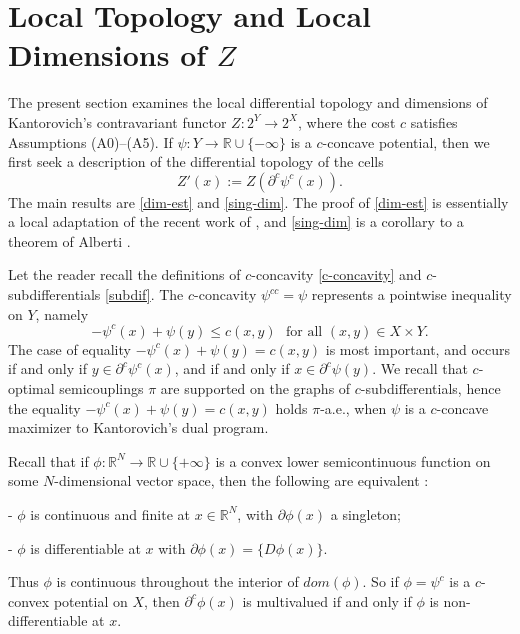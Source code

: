 \documentclass[12pt]{amsart}
\theoremstyle{definition}
\theoremstyle{remark}
\newcommand{\bR}{\mathbb{R}}
\newcommand{\del}{\partial}
\begin{document}
\section{Local Topology and Local Dimensions of $Z$}\label{locequations}
The present section examines the local differential topology and dimensions of Kantorovich's contravariant functor $Z: 2^Y \to 2^X$, where the cost $c$ satisfies Assumptions (A0)--(A5). If $\psi:Y\to \bR \cup \{-\infty\}$ is a $c$-concave potential, then we first seek a description of the differential topology of the cells $$Z'(x):=Z(\del^c \psi^c(x)).$$ The main results are \ref{dim-est} and \ref{sing-dim}. The proof of \ref{dim-est} is essentially a local adaptation of the recent work of \cite{KitMc}, and \ref{sing-dim} is a corollary to a theorem of Alberti \cite{Alberti}. %

Let the reader recall the definitions of $c$-concavity \ref{c-concavity} and $c$-subdifferentials \ref{subdif}. The $c$-concavity $\psi^{cc}=\psi$ represents a pointwise inequality on $Y$, namely \begin{equation}\label{flineq}-\psi^c(x)+\psi(y) \leq c(x,y) \text{~~for all~} (x,y)\in X\times Y.\end{equation} The case of equality $-\psi^c(x)+\psi(y) = c(x,y)$ is most important, and occurs if and only if $y\in \del^c \psi^c (x)$, and if and only if $x \in \del^c \psi(y)$. We recall that $c$-optimal semicouplings $\pi$ are supported on the graphs of $c$-subdifferentials,  hence the equality $-\psi^c(x)+\psi(y)=c(x,y)$ holds $\pi$-a.e., when $\psi$ is a $c$-concave maximizer to Kantorovich's dual program.  

Recall that if $\phi: \bR^N \to \bR \cup \{+\infty\}$ is a convex lower semicontinuous function on some $N$-dimensional vector space, then the following are equivalent \cite[I.5.3, pp.23]{ET}: 

- $\phi$ is continuous and finite at $x\in \bR^N$, with $\del \phi(x)$ a singleton; 

- $\phi$ is differentiable at $x$ with $\del \phi(x)=\{D\phi(x)\}$.

Thus $\phi$ is continuous throughout the interior of $dom(\phi)$. So if $\phi=\psi^c$ is a $c$-convex potential on $X$, then $\del^c \phi(x)$ is multivalued if and only if $\phi$ is non-differentiable at $x$. 
\end{document}
